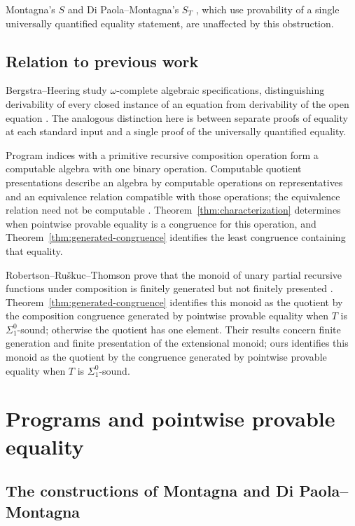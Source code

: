 \documentclass[11pt]{article}
\begin{document}
Montagna's $S$ \cite[p.~105]{Montagna} and Di Paola--Montagna's $S_T$
\cite[p.~646]{DiPaolaMontagna}, which use provability of a single
universally quantified equality statement, are unaffected by this obstruction.

\subsection{Relation to previous work}

Bergstra--Heering study $\omega$-complete algebraic specifications,
distinguishing derivability of every closed instance of an equation
from derivability of the open equation
\cite[Sections~1.2--1.3, pp.~150--152]{BergstraHeering}.
The analogous distinction here is between separate proofs of equality
at each standard input and a single proof of the universally quantified
equality.

Program indices with a primitive recursive composition operation form
a computable algebra with one binary operation. Computable quotient
presentations describe an algebra by computable operations on
representatives and an equivalence relation compatible with those
operations; the equivalence relation need not be computable
\cite[p.~9]{GodziszewskiHamkins}.
Theorem~\ref{thm:characterization} determines when pointwise provable
equality is a congruence for this operation, and
Theorem~\ref{thm:generated-congruence} identifies the least congruence
containing that equality.

Robertson--Ru\v{s}kuc--Thomson prove that the monoid of unary partial
recursive functions under composition is finitely generated but not
finitely presented
\cite[Theorems~2.2--2.3, pp.~168--169]{RobertsonRuskucThomson}.
Theorem~\ref{thm:generated-congruence} identifies this monoid as the
quotient by the composition congruence generated by pointwise provable
equality when $T$ is $\Sigma^0_1$-sound; otherwise the quotient has one
element. Their results concern finite generation and finite presentation
of the extensional monoid; ours identifies this monoid as the quotient
by the congruence generated by pointwise provable equality when $T$
is $\Sigma^0_1$-sound.

\section{Programs and pointwise provable equality}\label{sec:programs}

\subsection{The constructions of Montagna and Di Paola--Montagna}
\end{document}
